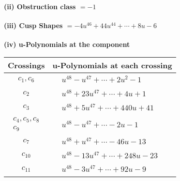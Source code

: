 \documentclass[1p]{elsarticle_modified}
\theoremstyle{definition}
\begin{document}
\flushleft \textbf{(ii) Obstruction class $= -1$}\\~\\
\flushleft \textbf{(iii) Cusp Shapes $= -4 u^{46}+44 u^{44}+\cdots+8 u-6$}\\~\\
\newpage\renewcommand{\arraystretch}{1}
\flushleft \textbf{(iv) u-Polynomials at the component}\newline \\
\begin{tabular}{m{50pt}|m{274pt}}
Crossings & \hspace{64pt}u-Polynomials at each crossing \\
\hline $$\begin{aligned}c_{1},c_{6}\end{aligned}$$&$\begin{aligned}
&u^{48}- u^{47}+\cdots+2 u^2-1
\end{aligned}$\\
\hline $$\begin{aligned}c_{2}\end{aligned}$$&$\begin{aligned}
&u^{48}+23 u^{47}+\cdots+4 u+1
\end{aligned}$\\
\hline $$\begin{aligned}c_{3}\end{aligned}$$&$\begin{aligned}
&u^{48}+5 u^{47}+\cdots+440 u+41
\end{aligned}$\\
\hline $$\begin{aligned}c_{4},c_{5},c_{8}\\c_{9}\end{aligned}$$&$\begin{aligned}
&u^{48}- u^{47}+\cdots-2 u-1
\end{aligned}$\\
\hline $$\begin{aligned}c_{7}\end{aligned}$$&$\begin{aligned}
&u^{48}+u^{47}+\cdots-46 u-13
\end{aligned}$\\
\hline $$\begin{aligned}c_{10}\end{aligned}$$&$\begin{aligned}
&u^{48}-13 u^{47}+\cdots+248 u-23
\end{aligned}$\\
\hline $$\begin{aligned}c_{11}\end{aligned}$$&$\begin{aligned}
&u^{48}-3 u^{47}+\cdots+92 u-9
\end{aligned}$\\
\hline
\end{tabular}\\~\\
\end{document}
